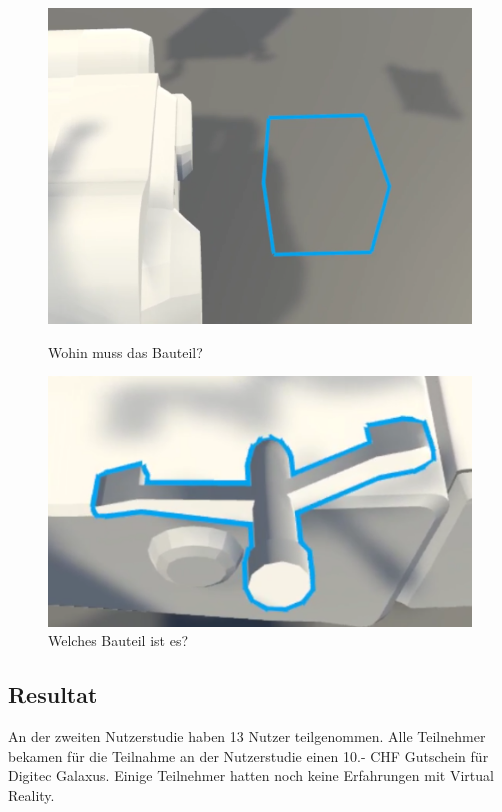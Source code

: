 \begin{figure}[h!]
	\centering
	\begin{minipage}[b]{0.49\linewidth}
		\centering
		\includegraphics[keepaspectratio,width=0.9\linewidth]{img/Wohin.PNG}
		\caption{Wohin muss das Bauteil?}
		\label{fig:wohin}
	\end{minipage}
	\hfill
	\begin{minipage}[b]{0.49\linewidth}
		\centering
		\includegraphics[keepaspectratio,width=0.9\linewidth]{img/Welches.PNG}
		\caption{Welches Bauteil ist es?}
		\label{fig:welches}
	\end{minipage}
\end{figure}

\subsection{Resultat}
An der zweiten Nutzerstudie haben 13 Nutzer teilgenommen. Alle Teilnehmer bekamen für die Teilnahme an der Nutzerstudie einen 10.- CHF Gutschein für Digitec Galaxus. Einige Teilnehmer hatten noch keine Erfahrungen mit Virtual Reality.

